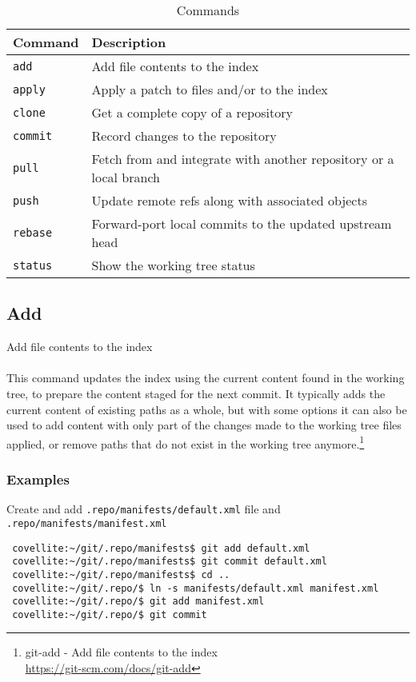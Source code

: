 \documentclass[12pt,letterpaper,dvips]{article}
\newcommand{\cmd}[1]{\texttt{#1}}
\begin{document}
\begin{table}[htb]
\begin{center}
\begin{tabular}{|p{}|p{}|}\hline
Command&Description\\
\hline
\cmd{add}&Add file contents to the index\\
\cmd{apply}&Apply a patch to files and/or to the index\\
\cmd{clone}&Get a complete copy of a repository\\
\cmd{commit}&Record changes to the repository\\
\cmd{pull}&Fetch from and integrate with another repository or a local branch\\
\cmd{push}&Update remote refs along with associated objects\\
\cmd{rebase}&Forward-port local commits to the updated upstream head\\
\cmd{status}&Show the working tree status\\
\hline
\end{tabular}
\caption {Commands}
\label{table:commands}
\end{center}
\end{table}


\subsection{Add}
Add file contents to the index
\\
\\
This command updates the index using the current content found in
the working tree, to prepare the content staged for the next
commit.  It typically adds the current content of existing paths
as a whole, but with some options it can also be used to add
content with only part of the changes made to the working tree
files applied, or remove paths that do not exist in the working
tree anymore.\footnote{git-add - Add file contents to the index\\
\href{https://git-scm.com/docs/git-add}{https://git-scm.com/docs/git-add}}


\subsubsection{Examples}
Create and add \cmd{.repo/manifests/default.xml} file and
\cmd{.repo/manifests/manifest.xml}
\begin{Verbatim}
 covellite:~/git/.repo/manifests$ git add default.xml
 covellite:~/git/.repo/manifests$ git commit default.xml
 covellite:~/git/.repo/manifests$ cd ..
 covellite:~/git/.repo/$ ln -s manifests/default.xml manifest.xml
 covellite:~/git/.repo/$ git add manifest.xml
 covellite:~/git/.repo/$ git commit
\end{Verbatim}
\end{document}
